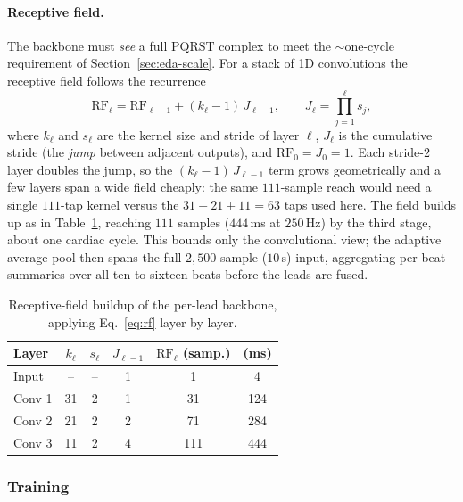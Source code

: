 \documentclass[sigconf,nonacm]{acmart}
\begin{document}
\paragraph{Receptive field.}
The backbone must \emph{see} a full PQRST complex to meet the $\sim$one-cycle
requirement of Section~\ref{sec:eda-scale}. For a stack of 1D convolutions
the receptive field follows the recurrence
\begin{equation}
\mathrm{RF}_\ell = \mathrm{RF}_{\ell-1} + (k_\ell - 1)\,J_{\ell-1},
\qquad
J_\ell = \prod_{j=1}^{\ell} s_j ,
\label{eq:rf}
\end{equation}
where $k_\ell$ and $s_\ell$ are the kernel size and stride of layer $\ell$,
$J_\ell$ is the cumulative stride (the \emph{jump} between adjacent outputs),
and $\mathrm{RF}_0 = J_0 = 1$. Each stride-$2$ layer doubles the jump, so the
$(k_\ell-1)\,J_{\ell-1}$ term grows geometrically and a few layers span a
wide field cheaply: the same $111$-sample reach would need a single
$111$-tap kernel versus the $31{+}21{+}11=63$ taps used here. The field
builds up as in Table~\ref{tab:rf}, reaching $111$ samples ($444$\,ms at
$250$\,Hz) by the third stage, about one cardiac cycle. This bounds only
the convolutional view; the adaptive average pool then spans the full
$2{,}500$-sample ($10$\,s) input, aggregating per-beat summaries over all
ten-to-sixteen beats before the leads are fused.

\begin{table}[H]
\centering
\caption{Receptive-field buildup of the per-lead backbone, applying
Eq.~\eqref{eq:rf} layer by layer.}
\label{tab:rf}
\small
\begin{tabular}{@{}lccccc@{}}
\toprule
\textbf{Layer} & $k_\ell$ & $s_\ell$ & $J_{\ell-1}$ & $\mathrm{RF}_\ell$ (samp.) & (ms) \\
\midrule
Input  & --& --& 1 & 1   & 4   \\
Conv 1 & 31 & 2  & 1 & 31  & 124 \\
Conv 2 & 21 & 2  & 2 & 71  & 284 \\
Conv 3 & 11 & 2  & 4 & 111 & 444 \\
\bottomrule
\end{tabular}
\end{table}

\subsubsection{Training}
\label{sec:cnn-train}
\end{document}

